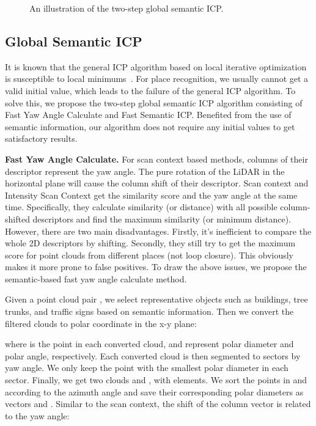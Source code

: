 \documentclass[letterpaper, 10 pt, conference]{ieeeconf}
\begin{document}
\begin{figure}[t]
    \centering
{}
    \caption{An illustration of the two-step global semantic ICP.}
    \label{pic:yaw_icp}
 \end{figure}

\subsection{Global Semantic ICP}
It is known that the general ICP algorithm based on local iterative optimization is susceptible to local minimums~\cite{goicp}. For place recognition, we usually cannot get a valid initial value, which leads to the failure of the general ICP algorithm. To solve this, we propose the two-step global semantic ICP algorithm consisting of Fast Yaw Angle Calculate and Fast Semantic ICP. Benefited from the use of semantic information, our algorithm does not require any initial values to get satisfactory results.

\textbf{Fast Yaw Angle Calculate.}\label{ssc:yaw}
For scan context based methods, columns of their descriptor represent the yaw angle. The pure rotation of the LiDAR in the horizontal plane will cause the column shift of their descriptor. Scan context and Intensity Scan Context get the similarity score and the yaw angle at the same time. Specifically, they calculate similarity (or distance) with all possible column-shifted descriptors and find the maximum similarity (or minimum distance). However, there are two main disadvantages. Firstly, it's inefficient to compare the whole 2D descriptors by shifting. Secondly, they still try to get the maximum score for point clouds from different places (not loop closure). This obviously makes it more prone to false positives. To draw the above issues, we propose the semantic-based fast yaw angle calculate method.

Given a point cloud pair , we select representative objects such as buildings, tree trunks, and traffic signs based on semantic information. Then we convert the filtered clouds to polar coordinate in  the x-y plane:


where  is the  point in each converted cloud,  and  represent polar diameter and polar angle, respectively. Each converted cloud is then segmented to  sectors by yaw angle. We only keep the point with the smallest polar diameter in each sector. Finally, we get two clouds  and , with  elements. We sort the points in  and  according to the azimuth angle and save their corresponding polar diameters as vectors  and . Similar to the scan context, the shift of the column vector is related to the yaw angle:
 
\end{document}
